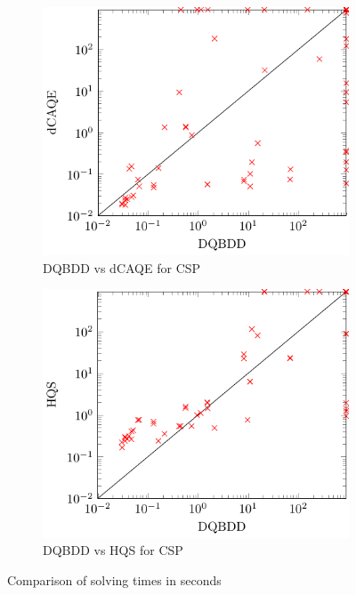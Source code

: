 \documentclass[
  digital, %
  color,
  twoside, %
  table,   %
  nolof,     %
  nolot,     %
]{fithesis3}
\theoremstyle{definition}
\theoremstyle{remark}
\begin{document}
\begin{figure}[p]
\begin{subfigure}{0.48\textwidth}
    \centering
    \includegraphics[width=\linewidth]{figures/CSPdqbddVSdcaqe.pdf}
    \caption{DQBDD vs dCAQE for CSP}
    \label{fig:CSPdqbddVSdcaqe}
  \end{subfigure}
  \begin{subfigure}{0.48\textwidth}
    \centering
    \includegraphics[width=\linewidth]{figures/CSPdqbddVShqs.pdf}
    \caption{DQBDD vs HQS for CSP}
    \label{fig:CSPdqbddVShqs}
  \end{subfigure}
  \caption{Comparison of solving times in seconds}
  \label{fig:runtimecomp}
\end{figure}
\end{document}
